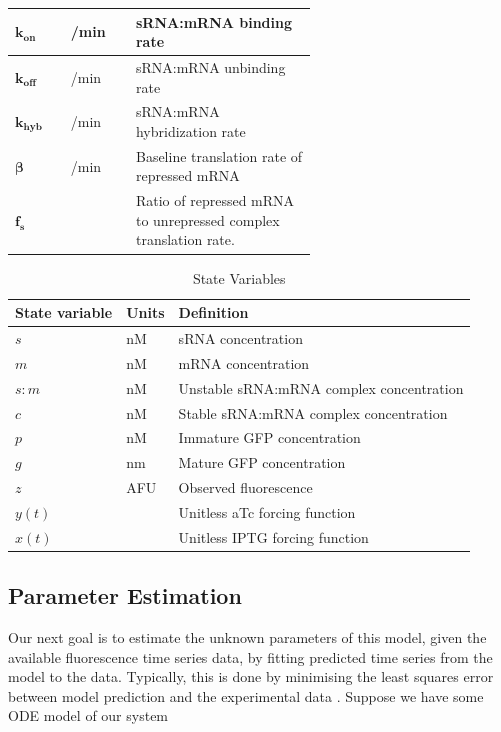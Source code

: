 \documentclass[10pt,journal]{./IEEE_latex_class/IEEEtran}
\begin{document}
\begin{table}[h]
\begin{tabular}{| l | l | p{0.6\linewidth} |}
\hline $\boldsymbol{k_{on}}$ &   /min & sRNA:mRNA binding rate \\
\hline $\boldsymbol{k_{off}}$ &  /min & sRNA:mRNA unbinding rate \\
\hline $\boldsymbol{k_{hyb}}$ &  /min & sRNA:mRNA hybridization rate \\
\hline $\boldsymbol{\beta}$ &   /min & Baseline translation rate of repressed mRNA \\
\hline $\boldsymbol{f_{s}}$ & & Ratio of repressed mRNA to unrepressed complex translation rate. \\
\hline
\end{tabular}
\end{table}

\begin{table}[h]
\renewcommand{\arraystretch}{1.3}
\caption{State Variables}
\label{StateVariables}
\centering
\begin{tabular}{| l | l | l|}
\hline \textbf{State variable} & Units &  \textbf{Definition}  \\
\hline\hline $s$  & nM & sRNA concentration \\
\hline $m$ & nM & mRNA concentration  \\
\hline $s:m$ &  nM & Unstable sRNA:mRNA complex concentration  \\
\hline $c$ &  nM & Stable sRNA:mRNA complex concentration  \\
\hline $p$ & nM & Immature GFP concentration  \\
\hline $g$ &  nm & Mature GFP concentration  \\
\hline $z$ & AFU & Observed fluorescence  \\
\hline $y(t)$ & & Unitless aTc forcing function  \\
\hline $x(t)$ &  & Unitless IPTG forcing function  \\
\hline
\end{tabular}
\end{table}



\subsection{Parameter Estimation}
Our next goal is to estimate the unknown parameters of this model, given the available fluorescence time series data, by fitting predicted time series from the model to the data. Typically, this is done by minimising the least squares error between model prediction and the experimental data \cite{Brewer2008,Algorithms2003, Hu2015}. Suppose we have some ODE model of our system
\end{document}
